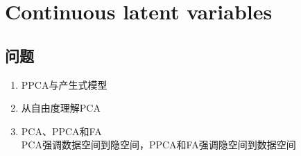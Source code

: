 \chapter{Continuous latent variables}
\section{问题}
\begin{enumerate}
\item PPCA与产生式模型
\item 从自由度理解PCA
\item PCA、PPCA和FA\\
PCA强调数据空间到隐空间，PPCA和FA强调隐空间到数据空间
\end{enumerate}
